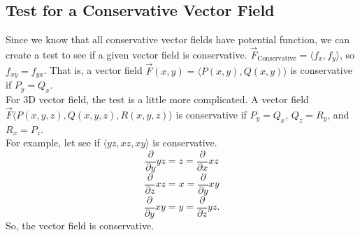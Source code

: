 \subsection{Test for a Conservative Vector Field}
\noindent
Since we know that all conservative vector fields have potential function, we can create a test to see if a given vector field is conservative. $\vec{F}_{\text{Conservative}} = \langle f_x, f_y \rangle$, so $f_{xy} = f_{yx}$. That is, a vector field $\vec{F}(x,y) = \langle P(x,y), Q(x,y) \rangle$ is conservative if $P_y = Q_x$.\\
For 3D vector field, the test is a little more complicated. A vector field $\vec{F}\langle P(x,y,z), Q(x,y,z), R(x,y,z)\rangle$ is conservative if $P_y = Q_x$, $Q_z = R_y$, and $R_x = P_z$.\\

\noindent
For example, let see if $\langle yz, xz, xy\rangle$ is conservative.
\begin{equation*}
	\frac{\partial}{\partial y}yz = z = \frac{\partial}{\partial x}xz
\end{equation*}
\begin{equation*}
	\frac{\partial}{\partial z}xz = x = \frac{\partial}{\partial y}xy
\end{equation*}
\begin{equation*}
	\frac{\partial}{\partial y}xy = y = \frac{\partial}{\partial z}yz.
\end{equation*}
So, the vector field is conservative.